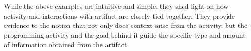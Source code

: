 
While the above examples are intuitive and simple, they shed light on how activity and interactions with artifact are closely tied together. They provide evidence to the notion that not only does context arise from the activity, but the programming activity and the goal behind it guide the specific type and amount of information obtained from the artifact.










